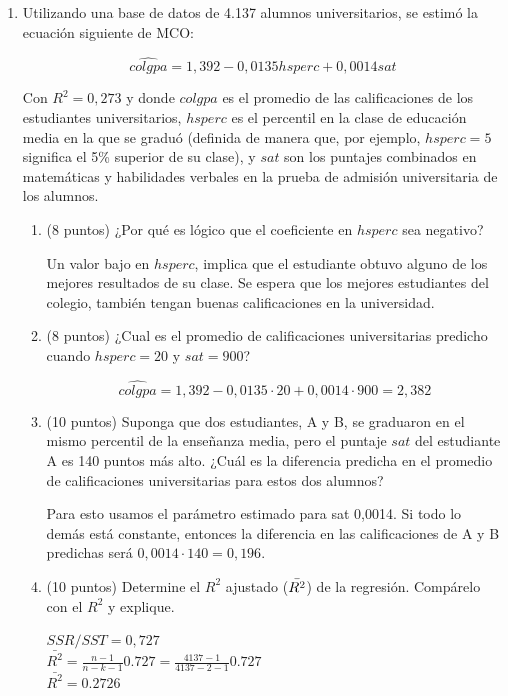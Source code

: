 \documentclass[10pt,a4paper]{article}
\begin{document}
\begin{enumerate}
\textbf{Fin de ejercicio.}



    \item Utilizando una base de datos de 4.137 alumnos universitarios, se estimó la ecuación siguiente de MCO:

    
$$\hat{colgpa} =1,392 -0,0135 hsperc + 0,0014 sat$$

Con $R^2=0,273$ y donde $colgpa$ es el promedio de las calificaciones de los estudiantes universitarios,
$hsperc$ es el percentil en la clase de educación media en la que se graduó (definida de manera que, por
ejemplo, $hsperc= 5$ significa el 5\% superior de su clase), y $sat$ son los puntajes combinados en
matemáticas y habilidades verbales en la prueba de admisión universitaria de los alumnos.
\begin{enumerate} 
\item (8 puntos) ¿Por qué es lógico que el coeficiente en $hsperc$ sea negativo?

{\color{blue} Un valor  bajo en $hsperc$, implica que el estudiante obtuvo alguno de los mejores resultados de su clase. Se espera que los mejores estudiantes del colegio, también tengan buenas calificaciones en la universidad.  }
\item  (8 puntos) ¿Cual es el promedio de calificaciones universitarias predicho cuando $hsperc= 20$ y $sat=900$?

{\color{blue} $$\hat{colgpa} =1,392 -0,0135 \cdot 20 + 0,0014 \cdot 900=2,382$$}


\item (10 puntos) Suponga que dos estudiantes, A y B, se graduaron en el mismo percentil de la enseñanza media, pero el puntaje $sat$ del estudiante A es 140 puntos más alto. ¿Cuál es la diferencia predicha en el promedio
de calificaciones universitarias para estos dos alumnos? 

{\color{blue} Para esto usamos el parámetro estimado para sat 0,0014. Si todo lo demás está constante, entonces la diferencia en las calificaciones de A y B predichas será $0,0014\cdot 140=0,196$.}

\item (10 puntos) Determine el $R^2$ ajustado ($\Bar{R^2}$) de la regresión. Compárelo con el $R^2$ y explique.

{\color{blue}
$SSR/SST=	0,727$\\
$\bar{R^2}=\frac{n-1}{n-k-1}0.727=\frac{4137-1}{4137-2-1}0.727$\\
$\bar{R^2}=0.2726$

}
\end{enumerate}
\end{enumerate}
\end{document}
